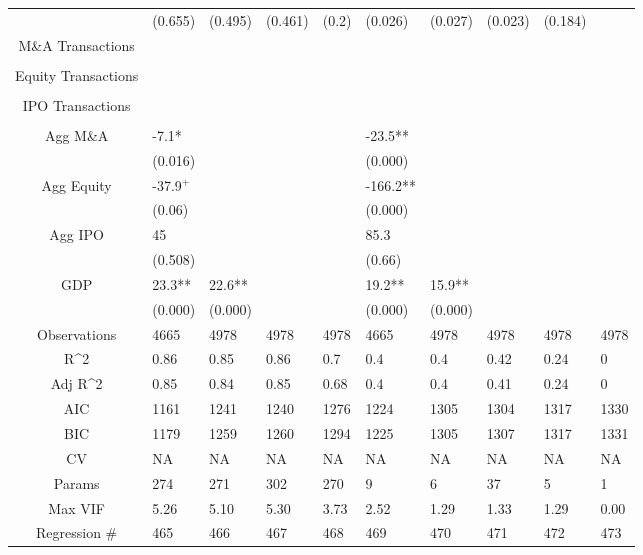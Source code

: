 \documentclass{article}
\begin{document}
\begin{table}[H]
\begin{tabular}{|clllllllll|}
   & (0.655) & (0.495) & (0.461) & (0.2) & (0.026) & (0.027) & (0.023) & (0.184) &  \\ 
  M\&A Transactions &  &  &  &  &  &  &  &  &  \\ 
   &  &  &  &  &  &  &  &  &  \\ 
  Equity Transactions &  &  &  &  &  &  &  &  &  \\ 
   &  &  &  &  &  &  &  &  &  \\ 
  IPO Transactions &  &  &  &  &  &  &  &  &  \\ 
   &  &  &  &  &  &  &  &  &  \\ 
  Agg M\&A & -7.1* &  &  &  & -23.5** &  &  &  &  \\ 
   & (0.016) &  &  &  & (0.000) &  &  &  &  \\ 
  Agg Equity & -37.9$^{+}$ &  &  &  & -166.2** &  &  &  &  \\ 
   & (0.06) &  &  &  & (0.000) &  &  &  &  \\ 
  Agg IPO & 45 &  &  &  & 85.3 &  &  &  &  \\ 
   & (0.508) &  &  &  & (0.66) &  &  &  &  \\ 
  GDP & 23.3** & 22.6** &  &  & 19.2** & 15.9** &  &  &  \\ 
   & (0.000) & (0.000) &  &  & (0.000) & (0.000) &  &  &  \\ 
  \hline 
 Observations & 4665 & 4978 & 4978 & 4978 & 4665 & 4978 & 4978 & 4978 & 4978 \\ 
  R^2 & 0.86 & 0.85 & 0.86 & 0.7 & 0.4 & 0.4 & 0.42 & 0.24 & 0 \\ 
  Adj R^2 & 0.85 & 0.84 & 0.85 & 0.68 & 0.4 & 0.4 & 0.41 & 0.24 & 0 \\ 
  AIC & 1161 & 1241 & 1240 & 1276 & 1224 & 1305 & 1304 & 1317 & 1330 \\ 
  BIC & 1179 & 1259 & 1260 & 1294 & 1225 & 1305 & 1307 & 1317 & 1331 \\ 
  CV & NA & NA & NA & NA & NA & NA & NA & NA & NA \\ 
  Params & 274 & 271 & 302 & 270 & 9 & 6 & 37 & 5 & 1 \\ 
  Max VIF & 5.26 & 5.10 & 5.30 & 3.73 & 2.52 & 1.29 & 1.33 & 1.29 & 0.00 \\ 
  Regression \# & 465 & 466 & 467 & 468 & 469 & 470 & 471 & 472 & 473 \\ 
   \hline
\end{tabular}
 
\end{table}
\end{document}
